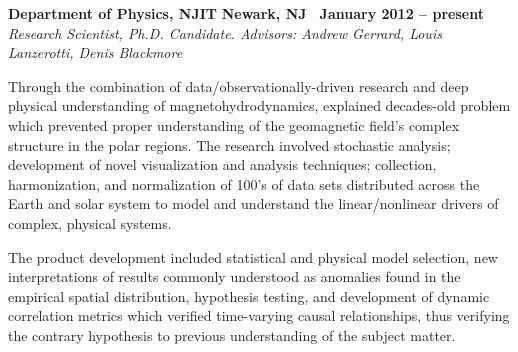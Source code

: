 \documentclass[10pt]{article}
\newcommand{\leftandright}[2]{\noindent\textbf{#1}\hfill
\textbf{#2}}
\begin{document}
\leftandright{Department of Physics, NJIT}{Newark, NJ \textbullet\, January
2012 -- present} \\  
\vspace{-0.8em}
\textit{Research Scientist, Ph.D. Candidate. Advisors: Andrew Gerrard,
Louis Lanzerotti, Denis Blackmore} 
\begin{itemize*}
  \item 
    Through the combination of data/observationally-driven research and deep
    physical understanding of magnetohydrodynamics, explained
    decades-old problem which prevented proper understanding of the geomagnetic field's
    complex structure in the polar regions. The research involved
    stochastic analysis; development of novel visualization and
    analysis techniques; collection, harmonization, and normalization of
    100's of data sets distributed across the Earth and solar system
    to model and understand the linear/nonlinear drivers of complex,
    physical systems.
  \item The product development included statistical and physical model
    selection, new interpretations of results commonly understood as
    anomalies found in the empirical spatial distribution, hypothesis
    testing, and development of dynamic correlation metrics which verified 
    time-varying causal relationships, thus verifying the 
    contrary hypothesis to previous understanding of the subject matter.
\end{itemize*}
\end{document}

